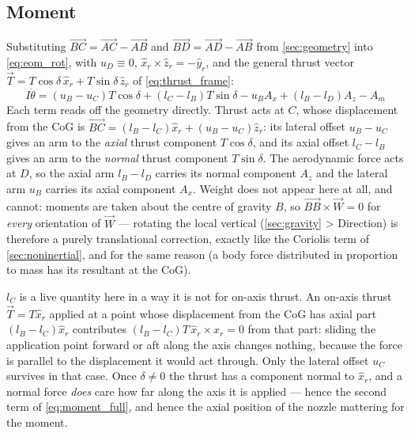 \subsection{Moment}\label{sec:analysis_moment}
Substituting $\vec{BC}=\vec{AC}-\vec{AB}$ and $\vec{BD}=\vec{AD}-\vec{AB}$ from
\autoref{sec:geometry} into \autoref{eq:eom_rot}, with $u_D\equiv0$,
$\hat{x}_r\times\hat{z}_r=-\hat{y}_r$, and the general thrust vector $\vec{T}=T\cos\delta\,
\hat{x}_r+T\sin\delta\,\hat{z}_r$ of \autoref{eq:thrust_frame}:
\begin{equation} \label{eq:moment_full}
    I\ddot{\theta} = (u_B - u_C)T\cos\delta + (l_C - l_B)T\sin\delta
                     - u_BA_x + (l_B - l_D)A_z - A_m
\end{equation}
Each term reads off the geometry directly. Thrust acts at $C$, whose displacement from the CoG is
$\vec{BC}=(l_B-l_C)\hat{x}_r+(u_B-u_C)\hat{z}_r$: its lateral offset $u_B-u_C$ gives an arm to the
\emph{axial} thrust component $T\cos\delta$, and its axial offset $l_C-l_B$ gives an arm to the
\emph{normal} thrust component $T\sin\delta$. The aerodynamic force acts at $D$, so the axial arm
$l_B-l_D$ carries its normal component $A_z$ and the lateral arm $u_B$ carries its axial component
$A_x$. Weight does not appear here at all, and cannot: moments are taken about the centre of
gravity $B$, so $\vec{BB}\times\vec{W}=0$ for \emph{every} orientation of $\vec{W}$ --- rotating
the local vertical (\autoref{sec:gravity} > Direction) is therefore a purely translational
correction, exactly like the Coriolis term of \autoref{sec:noninertial}, and for the same reason
(a body force distributed in proportion to mass has its resultant at the CoG).

$l_C$ is a live quantity here in a way it is not for on-axis thrust. An on-axis thrust
$\vec{T}=T\hat{x}_r$ applied at a point whose displacement from the CoG has axial part
$(l_B-l_C)\hat{x}_r$ contributes $(l_B-l_C)T\,\hat{x}_r\times\hat{x}_r=0$ from that part: sliding
the application point forward or aft along the axis changes nothing, because the force is parallel
to the displacement it would act through. Only the lateral offset $u_C$ survives in that case.
Once $\delta\neq0$ the thrust has a component normal to $\hat{x}_r$, and a normal force
\emph{does} care how far along the axis it is applied --- hence the second term of
\autoref{eq:moment_full}, and hence the axial position of the nozzle mattering for the moment.

